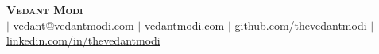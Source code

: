\begin{center}
    \vspace{-1pt}
    \textbf{\Huge \scshape Vedant Modi} \\ 
    \vspace{0.5pt}
    \small  $|$ 
    \href{mailto:vedant@vedantmodi.com}{\underline{vedant@vedantmodi.com}} $|$ 
    \href{https://www.vedantmodi.com}{\underline{vedantmodi.com}} $|$
    \href{https://github.com/thevedantmodi}{\underline{github.com/thevedantmodi}} $|$
    \href{https://www.linkedin.com/in/thevedantmodi}{\underline{linkedin.com/in/thevedantmodi}}
    
\end{center}

